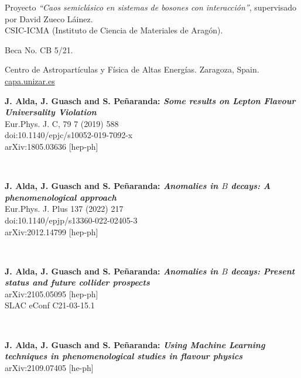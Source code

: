 \documentclass[combined.tex]{subfiles}
\begin{document}
Proyecto \textit{``Caos semiclásico en sistemas de bosones con interacción''}, supervisado por David Zueco Láinez.\\
CSIC-ICMA (Instituto de Ciencia de Materiales de Aragón).


Beca No. CB 5/21.

Centro de Astropartículas y Física de Altas Energías. Zaragoza, Spain.\\
\url{capa.unizar.es}



\hspace{\parindent}
\textbf{J. Alda, J. Guasch and S. Peñaranda: \textit{Some results on Lepton Flavour Universality Violation}}\\
Eur.Phys. J. C, 79 7 (2019) 588\\
doi:10.1140/epjc/s10052-019-7092-x\\
arXiv:1805.03636 [hep-ph]

~

\textbf{J. Alda, J. Guasch and S. Peñaranda: \textit{Anomalies in $B$ decays: A phenomenological approach}}\\
Eur.Phys. J. Plus 137 (2022) 217\\
doi:10.1140/epjp/s13360-022-02405-3\\
arXiv:2012.14799 [hep-ph]

~

\textbf{J. Alda, J. Guasch and S. Peñaranda: \textit{Anomalies in $B$ decays: Present status and future collider prospects}}\\
arXiv:2105.05095 [hep-ph]\\
SLAC eConf C21-03-15.1

~

\textbf{J. Alda, J. Guasch and S. Peñaranda: \textit{Using Machine Learning techniques in phenomenological studies in flavour physics}}\\
arXiv:2109.07405 [he-ph]

~
\end{document}
